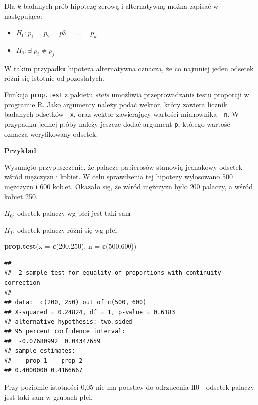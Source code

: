 \documentclass[
]{book}
\newenvironment{Shaded}{\begin{snugshade}}{\end{snugshade}}
\newcommand{\DataTypeTok}[1]{\textcolor[rgb]{0.13,0.29,0.53}{#1}}
\newcommand{\DecValTok}[1]{\textcolor[rgb]{0.00,0.00,0.81}{#1}}
\newcommand{\KeywordTok}[1]{\textcolor[rgb]{0.13,0.29,0.53}{\textbf{#1}}}
\newcommand{\NormalTok}[1]{#1}
\providecommand{\tightlist}{%
  \setlength{\itemsep}{0pt}\setlength{\parskip}{0pt}}
\begin{document}
Dla \(k\) badanych prób hipotezę zerową i alternatywną można zapisać w następująco:

\begin{itemize}
\tightlist
\item
  \(H_0: p_1=p_2=p3=...=p_k\)
\item
  \(H_1: \exists \; p_i \neq p_j\)
\end{itemize}

W takim przypadku hipoteza alternatywna oznacza, że co najmniej jeden odsetek różni się istotnie od pozostałych.

Funkcja \texttt{prop.test} z pakietu \emph{stats} umożliwia przeprowadzanie testu proporcji w programie R. Jako argumenty należy podać wektor, który zawiera licznik badanych odsetków - \texttt{x}, oraz wektor zawierający wartości mianownika - \texttt{n}. W przypadku jednej próby należy jeszcze dodać argument \texttt{p}, którego wartość oznacza weryfikowany odsetek.

\textbf{Przykład}

Wysunięto przypuszczenie, że palacze papierosów stanowią jednakowy odsetek wśród mężczyzn i kobiet. W celu sprawdzenia tej hipotezy wylosowano 500 mężczyzn i 600 kobiet. Okazało się, że wśród mężczyzn było 200 palaczy, a wśród kobiet 250.

\(H_0\): odsetek palaczy wg płci jest taki sam

\(H_1\): odsetek palaczy różni się wg płci

\begin{Shaded}
\begin{Highlighting}[]
\KeywordTok{prop.test}\NormalTok{(}\DataTypeTok{x =} \KeywordTok{c}\NormalTok{(}\DecValTok{200}\NormalTok{,}\DecValTok{250}\NormalTok{), }\DataTypeTok{n =} \KeywordTok{c}\NormalTok{(}\DecValTok{500}\NormalTok{,}\DecValTok{600}\NormalTok{))}
\end{Highlighting}
\end{Shaded}

\begin{verbatim}
## 
##  2-sample test for equality of proportions with continuity correction
## 
## data:  c(200, 250) out of c(500, 600)
## X-squared = 0.24824, df = 1, p-value = 0.6183
## alternative hypothesis: two.sided
## 95 percent confidence interval:
##  -0.07680992  0.04347659
## sample estimates:
##    prop 1    prop 2 
## 0.4000000 0.4166667
\end{verbatim}

Przy poziomie istotności 0,05 nie ma podstaw do odrzucenia H0 - odsetek palaczy jest taki sam w grupach płci.
\end{document}
